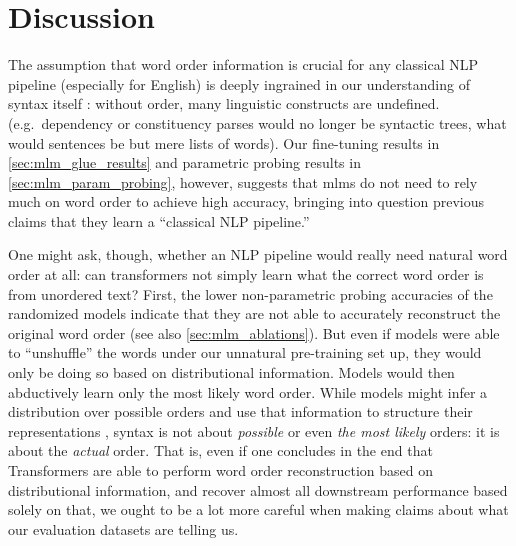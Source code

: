 \documentclass[letterpaper, 12pt]{report}
\begin{document}
\section{Discussion}
\label{sec:mlm_discussion}

The assumption that word order information is crucial for any classical NLP pipeline (especially for English) is deeply ingrained in our understanding of syntax itself \citep{chomsky1957syntactic}: without order, many linguistic constructs are undefined. (e.g.\ dependency or constituency parses would no longer be syntactic trees, what would sentences be but mere lists of words).
Our fine-tuning results in \autoref{sec:mlm_glue_results} and parametric probing results in \autoref{sec:mlm_param_probing}, however, suggests that \acrshort{mlm}s do not need to rely much on word order to achieve high accuracy, bringing into question previous claims that they learn a ``classical NLP pipeline.''


One might ask, though, whether an NLP pipeline would really need natural word order at all: can transformers not simply learn what the correct word order is from unordered text?
First, the lower non-parametric probing accuracies of the randomized models indicate that they are not able to accurately reconstruct the original word order (see also \autoref{sec:mlm_ablations}).
But even if models were able to ``unshuffle'' the words under our unnatural pre-training set up, they would only be doing so based on distributional information.
Models would then abductively learn only the most likely word order. %
While models might infer a distribution over possible orders and use that information to structure their representations \citep{papadimitriou-etal-2021-deep}, syntax is not about \emph{possible} or even  \emph{the most likely} orders: it is about the \emph{actual} order. That is, even if one concludes in the end that Transformers are able to perform word order reconstruction based on distributional information, and recover almost all downstream performance based solely on that, we ought to be a lot more careful when making claims about what our evaluation datasets are telling us.
\end{document}
